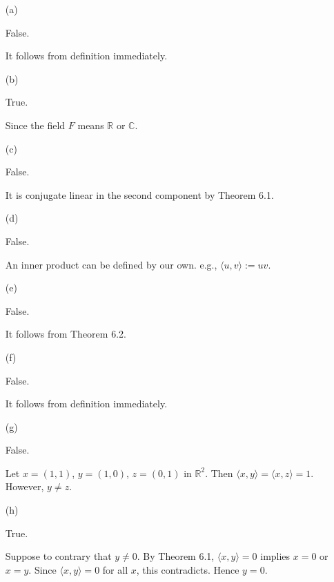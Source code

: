 \begin{Exercise}
\begin{enumerate}[(a)]
\item[(a)]
\begin{answer}
False.
\end{answer}
\begin{solution}
It follows from definition immediately.
\end{solution}

\item[(b)]
\begin{answer}
True.
\end{answer}
\begin{solution}
Since the field $F$ means $\mathbb{R}$ or $\mathbb{C}$.
\end{solution}

\item[(c)]
\begin{answer}
False.
\end{answer}
\begin{solution}
It is conjugate linear in the second component by Theorem 6.1.
\end{solution}

\item[(d)]
\begin{answer}
False.
\end{answer}
\begin{solution}
An inner product can be defined by our own. e.g., $\langle u,v\rangle := u v$.
\end{solution}

\item[(e)]
\begin{answer}
False.
\end{answer}
\begin{solution}
It follows from Theorem 6.2.
\end{solution}

\item[(f)]
\begin{answer}
False.
\end{answer}
\begin{solution}
It follows from definition immediately.
\end{solution}

\item[(g)]
\begin{answer}
False.
\end{answer}
\begin{solution}
Let $x = (1,1)$, $y = (1, 0)$, $z=(0,1)$ in $\mathbb{R}^2$. Then $\langle x, y \rangle = \langle x,z \rangle = 1$. However, $y\neq z$.
\end{solution}

\item[(h)]
\begin{answer}
True.
\end{answer}
\begin{solution}
Suppose to contrary that $y\neq 0$. By Theorem 6.1, $\langle x, y \rangle = 0$ implies $x = 0$ or $x = y$. Since $\langle x,y \rangle = 0$ for all $x$, this contradicts. Hence $y = 0$.
\end{solution}

\end{enumerate}
\end{Exercise}